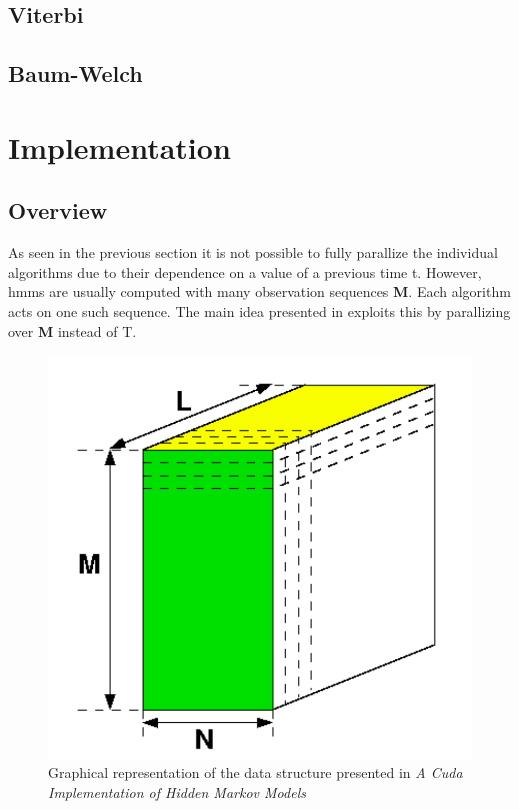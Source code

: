 \documentclass[english, paper=a4]{scrartcl}
\begin{document}
\subsection{Viterbi}

\subsection{Baum-Welch}

\newpage


\section{Implementation}

\subsection{Overview}

As seen in the previous section it is not possible to fully parallize the individual algorithms due to their dependence on a value of a previous time t. However, hmms are usually computed with many observation sequences \textbf{M}. Each algorithm acts on one such sequence. The main idea presented in \cite{cuhmm} exploits this by parallizing over \textbf{M} instead of T. 

\begin{figure}[H]
\centering

\includegraphics[scale=0.3]{"3d_trellis"}
  \caption{Graphical representation of the data structure presented in \textit{A Cuda Implementation of Hidden Markov Models}\cite{cuhmm}}
\end{figure}
\end{document}
